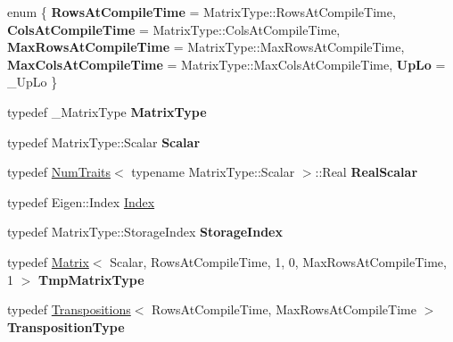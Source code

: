 \begin{DoxyCompactItemize}
\item 
\mbox{\label{class_eigen_1_1_l_d_l_t_ae2b60da927df84ff3040b85cd9699da5}} 
enum \{ \newline
{\bfseries Rows\+At\+Compile\+Time} = Matrix\+Type\+::Rows\+At\+Compile\+Time, 
{\bfseries Cols\+At\+Compile\+Time} = Matrix\+Type\+::Cols\+At\+Compile\+Time, 
{\bfseries Max\+Rows\+At\+Compile\+Time} = Matrix\+Type\+::Max\+Rows\+At\+Compile\+Time, 
{\bfseries Max\+Cols\+At\+Compile\+Time} = Matrix\+Type\+::Max\+Cols\+At\+Compile\+Time, 
\newline
{\bfseries Up\+Lo} = \+\_\+\+Up\+Lo
 \}
\item 
\mbox{\label{class_eigen_1_1_l_d_l_t_a402092cb89eee4d7bc7502a9eac0d318}} 
typedef \+\_\+\+Matrix\+Type {\bfseries Matrix\+Type}
\item 
\mbox{\label{class_eigen_1_1_l_d_l_t_a4e0935217cce5695a214c85e7ef813df}} 
typedef Matrix\+Type\+::\+Scalar {\bfseries Scalar}
\item 
\mbox{\label{class_eigen_1_1_l_d_l_t_a2fe48d9c6549347a6b5156f2b2724416}} 
typedef \mbox{\hyperlink{struct_eigen_1_1_num_traits}{Num\+Traits}}$<$ typename Matrix\+Type\+::\+Scalar $>$\+::Real {\bfseries Real\+Scalar}
\item 
typedef Eigen\+::\+Index \mbox{\hyperlink{class_eigen_1_1_l_d_l_t_ad9c57eb2fb3bbccd51b9d2e111bea355}{Index}}
\item 
\mbox{\label{class_eigen_1_1_l_d_l_t_a8c2f233230eb0b517fd9dde624567bf2}} 
typedef Matrix\+Type\+::\+Storage\+Index {\bfseries Storage\+Index}
\item 
\mbox{\label{class_eigen_1_1_l_d_l_t_aaf014c3e49793fadf342de6f96973166}} 
typedef \mbox{\hyperlink{class_eigen_1_1_matrix}{Matrix}}$<$ Scalar, Rows\+At\+Compile\+Time, 1, 0, Max\+Rows\+At\+Compile\+Time, 1 $>$ {\bfseries Tmp\+Matrix\+Type}
\item 
\mbox{\label{class_eigen_1_1_l_d_l_t_ac3d686008cbd74d1d2721c936f7ff8b1}} 
typedef \mbox{\hyperlink{class_eigen_1_1_transpositions}{Transpositions}}$<$ Rows\+At\+Compile\+Time, Max\+Rows\+At\+Compile\+Time $>$ {\bfseries Transposition\+Type}

\end{DoxyCompactItemize}

